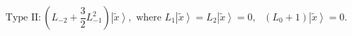 \begin{equation}
\text{Type II}:(L_{-2}+\frac{3}{2}L_{-1}^{2})\left\vert \widetilde{x}%
\right\rangle ,\text{ where }L_{1}\left\vert \widetilde{x}\right\rangle
=L_{2}\left\vert \widetilde{x}\right\rangle =0,\text{ }(L_{0}+1)\left\vert 
\widetilde{x}\right\rangle =0.  \tag{6}
\end{equation}%
